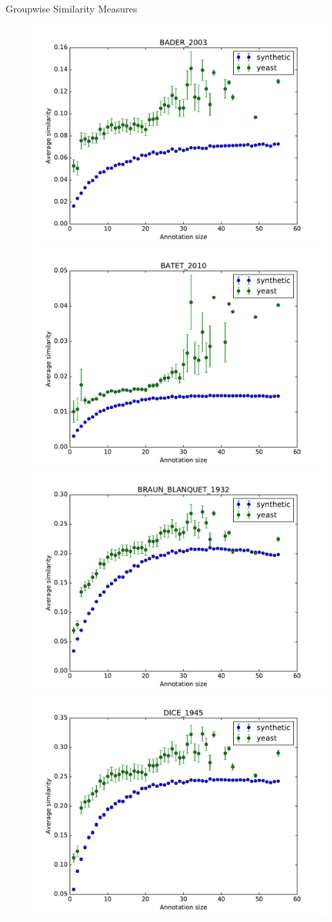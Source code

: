 \documentclass{beamer}
\begin{document}
\begin{frame}{Groupwise Similarity Measures}

\begin{figure}
\includegraphics[width=0.5\linewidth, height=0.4\textheight]{groupwise/SIM_FRAMEWORK_DAG_SET_BADER_2003_avg.pdf}
\includegraphics[width=0.5\linewidth, height=0.4\textheight]{groupwise/SIM_FRAMEWORK_DAG_SET_BATET_2010_avg.pdf} \\
\includegraphics[width=0.5\linewidth, height=0.4\textheight]{groupwise/SIM_FRAMEWORK_DAG_SET_BRAUN_BLANQUET_1932_avg.pdf}
\includegraphics[width=0.5\linewidth, height=0.4\textheight]{groupwise/SIM_FRAMEWORK_DAG_SET_DICE_1945_avg.pdf}
\end{figure}

\end{frame}
\end{document}
